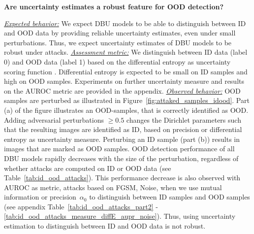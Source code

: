\begin{center}
	\textbf{Are uncertainty estimates a robust feature for OOD detection?}	
\end{center}
\underline{\emph{Expected behavior:}} We expect DBU models to be able to distinguish between ID and OOD data by providing reliable uncertainty estimates, even under small perturbations. Thus, we expect uncertainty estimates of DBU models to be robust under attacks. 
%
\underline{\emph{Assessment metric:}} We distinguish between ID data (label 0) and OOD data (label 1) based on the differential entropy as uncertainty scoring function \citep{malini2018}. Differential entropy is expected to be small on ID samples and high on OOD samples. Experiments on further uncertainty measure and results on the AUROC metric are provided in the appendix. 
%
\underline{\emph{Observed behavior:}} OOD samples are perturbed as illustrated in  Figure~\ref{fig:attaked_samples_idood}. Part (a) of the figure illustrates an OOD-samples, that is correctly identified as OOD. Adding adversarial perturbations $\geq 0.5$ changes the Dirichlet parameters such that the resulting images are identified as ID, based on precision or differential entropy as uncertainty measure. Perturbing an ID sample (part (b)) results in images that are marked as OOD samples. 
OOD detection performance of all DBU models rapidly decreases with the size of the perturbation, regardless of whether attacks are computed on ID or OOD data (see Table~\ref{tab:id_ood_attacks}). This performance decrease is also observed with AUROC as metric, attacks based on FGSM, Noise, when we use mutual information or precision~$\alpha_0$ to distinguish between ID samples and OOD samples (see appendix Table~\ref{tab:id_ood_attacks_part2} - \ref{tab:id_ood_attacks_measure_diffE_aupr_noise}). 
Thus, using uncertainty estimation to distinguish between ID and OOD data is not robust. 



